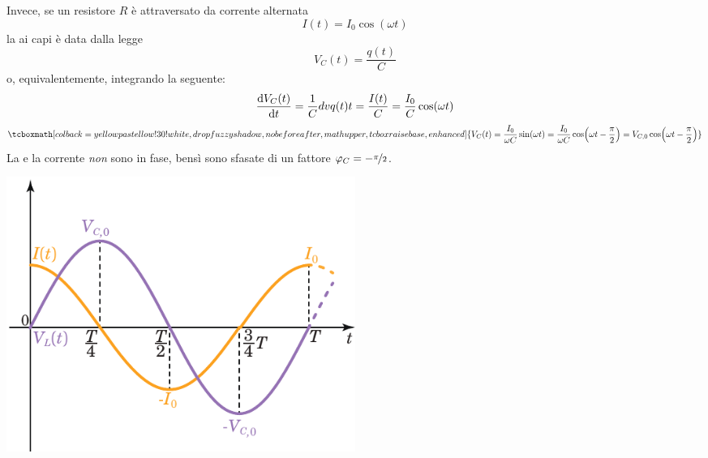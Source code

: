 Invece, se un resistore $R$ è attraversato da corrente alternata
\begin{equation*}
	I(t)=I_0\cos(\omega t)
\end{equation*}
la \ddp ai capi è data dalla legge
\begin{equation*}
	V_C(t)=\frac{q(t)}{C}
\end{equation*}
o, equivalentemente, integrando la seguente:
\begin{equation*}
	\dv{V_C(t)}{t}=\frac{1}{C}dv{q(t)}{t}=\frac{I(t)}{C}=\frac{I_0}{C}\cos(\omega t)
\end{equation*}
\begin{equation}
		\tcboxmath[colback=yellowpastellow!30!white,drop fuzzy shadow, nobeforeafter, math upper, tcbox raise base, enhanced]{V_C(t)=\frac{I_0}{\omega C}\sin(\omega t)=\frac{I_0}{\omega C}\cos(\omega t-\frac{\pi}{2})=V_{C,0}\cos(\omega t-\frac{\pi}{2})}
\end{equation}
La \ddp e la corrente \textit{non} sono in fase, bensì sono sfasate di un fattore $\oldphi_C=-\nicefrac{\pi}{2}$.
\begin{center}
	\includegraphics[width=0.5\textwidth]{images/chp11/chp11Csymbgraf2.pdf}
\end{center}
